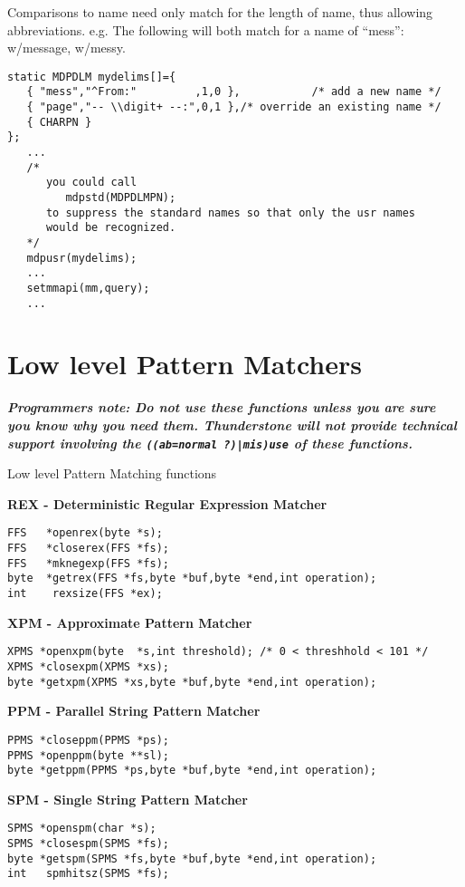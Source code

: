 Comparisons to name need only match for the length of name, thus
allowing abbreviations. e.g.  The following will both match for a
name of ``mess'':  w/message, w/messy.

\EXAMPLE
\begin{verbatim}
static MDPDLM mydelims[]={
   { "mess","^From:"         ,1,0 },           /* add a new name */
   { "page","-- \\digit+ --:",0,1 },/* override an existing name */
   { CHARPN }
};
   ...
   /*
      you could call
         mdpstd(MDPDLMPN);
      to suppress the standard names so that only the usr names
      would be recognized.
   */
   mdpusr(mydelims);
   ...
   setmmapi(mm,query);
   ...
\end{verbatim}

\chapter{Low level Pattern Matchers}

{\bf\em Programmers note: Do not use these functions unless you
are sure you know why you need them. Thunderstone will {\em not} provide technical
support involving the \verb`((ab=normal ?)|mis)use` of these functions. }

\NAME
{Low level Pattern Matching functions}

\SYNOPSIS
{\bf REX - Deterministic Regular Expression Matcher}

\begin{verbatim}
FFS   *openrex(byte *s);
FFS   *closerex(FFS *fs);
FFS   *mknegexp(FFS *fs);
byte  *getrex(FFS *fs,byte *buf,byte *end,int operation);
int    rexsize(FFS *ex);
\end{verbatim}

{\bf XPM - Approximate Pattern Matcher}
\begin{verbatim}
XPMS *openxpm(byte  *s,int threshold); /* 0 < threshhold < 101 */
XPMS *closexpm(XPMS *xs);
byte *getxpm(XPMS *xs,byte *buf,byte *end,int operation);
\end{verbatim}

{\bf PPM - Parallel String Pattern Matcher}
\begin{verbatim}
PPMS *closeppm(PPMS *ps);
PPMS *openppm(byte **sl);
byte *getppm(PPMS *ps,byte *buf,byte *end,int operation);
\end{verbatim}

{\bf SPM - Single String Pattern Matcher}
\begin{verbatim}
SPMS *openspm(char *s);
SPMS *closespm(SPMS *fs);
byte *getspm(SPMS *fs,byte *buf,byte *end,int operation);
int   spmhitsz(SPMS *fs);
\end{verbatim}

